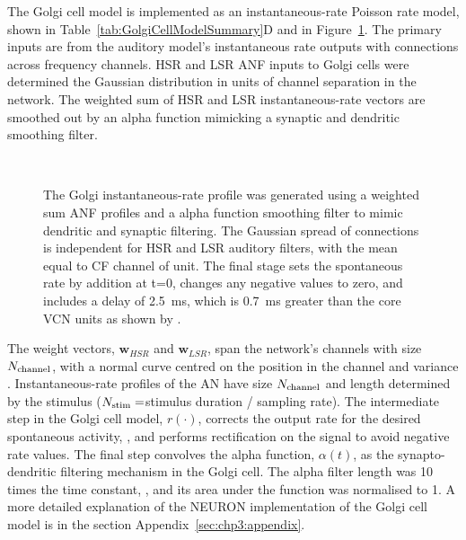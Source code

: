 % 

\smallskip{}

The Golgi cell model is implemented as an instantaneous-rate Poisson
rate model, shown in Table~\ref{tab:GolgiCellModelSummary}D and in
Figure~\ref{fig:GolgiDiagram}. The primary inputs are from the
auditory model's instantaneous rate outputs with connections across
frequency channels. HSR and LSR ANF inputs to Golgi cells were
determined the Gaussian distribution in units of channel separation in
the network. The weighted sum of HSR and LSR instantaneous-rate
vectors are smoothed out by an alpha function mimicking a synaptic and
dendritic smoothing filter.

 \begin{figure}[h!]
  \centering
  \\
  \caption{The Golgi instantaneous-rate profile was generated using a
    weighted sum ANF profiles and a alpha function smoothing filter to
    mimic dendritic and synaptic filtering. The Gaussian spread of
    connections is independent for HSR and LSR auditory filters, with
    the mean equal to CF channel of unit. The final stage sets the
    spontaneous rate by addition at t=0, changes any negative values
    to zero, and includes a delay of 2.5~ms, which is 0.7~ms greater
    than the core VCN units as shown by \citet{GhoshalKim:1997}.}
  \label{fig:GolgiDiagram}
 \end{figure}

\smallskip{}

The weight vectors, $\mathbf{w}_{HSR}$ and $\mathbf{w}_{LSR}$, span
the network's channels with size $N_{\rm channel}$, with a normal
curve centred on the position in the channel and variance
\sANFGLG\@. Instantaneous-rate profiles of the AN have size $N_{\rm
  channel}$ and length determined by the stimulus ($N_{\rm
  stim}=$stimulus duration / sampling rate).  The intermediate step in
the Golgi cell model, $r(\cdot)$, corrects the output rate for the
desired spontaneous activity, \Gspon, and performs rectification on
the signal to avoid negative rate values.  The final step convolves
the alpha function, $\alpha(t)$, as the synapto-dendritic filtering
mechanism in the Golgi cell. The alpha filter length was 10 times the
time constant, \Gtau, and its area under the function was normalised
to 1.  A more detailed explanation of the NEURON implementation of the
Golgi cell model is in the section Appendix~\ref{sec:chp3:appendix}.  


